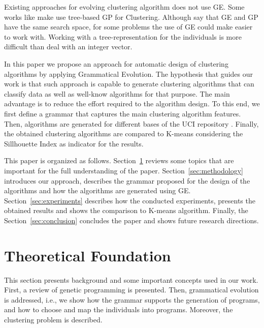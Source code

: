 \documentclass[conference,compsoc]{IEEEtran}
\begin{document}
Existing approaches for evolving clustering algorithm does not use GE. Some works like \cite{ahn2011genetic, xie2006population, boric2007genetic} make use tree-based GP for Clustering. Although \cite{harris2015comparison} say that GE and GP have the same search space, for some problems the use of GE could make easier to work with. Working with a tree-representation for the individuals is more difficult than deal with an integer vector.

In this paper we propose an approach for automatic design of clustering algorithms by applying Grammatical Evolution. The hypothesis that guides our work is that such approach is capable to generate clustering algorithms that can classify data as well as well-know algorithms for that purpose. The main advantage is to reduce the effort required to the algorithm design. To this end, we first define a grammar that captures the main clustering algorithm features. Then, algorithms are generated for different bases of the UCI repository \cite{uci}. Finally, the obtained clustering algorithms are compared to K-means \cite{kanungo2002efficient} considering the Sillhouette Index \cite{rousseeuw1987silhouettes} as indicator for the results.

This paper is organized as follows. Section~\ref{sec:theoretical_foudation} reviews some topics that are important for the full understanding of the paper. Section~\ref{sec:methodology} introduces our approach,  describes the grammar proposed for the design of the algorithms and how the algorithms are generated using GE. Section~\ref{sec:experiments} describes how the conducted experiments,  presents the obtained results and shows the comparison to K-means algorithm. Finally, the Section~\ref{sec:conclusion} concludes the paper and shows future research directions.



\section{Theoretical Foundation} \label{sec:theoretical_foudation}

This section presents background and some important concepts used in our work. First, a review of genetic programming is presented. Then, grammatical evolution is addressed, i.e., we show how the grammar supports the generation of programs, and how to choose and map the individuals into programs. Moreover, the clustering problem is described.
\end{document}
